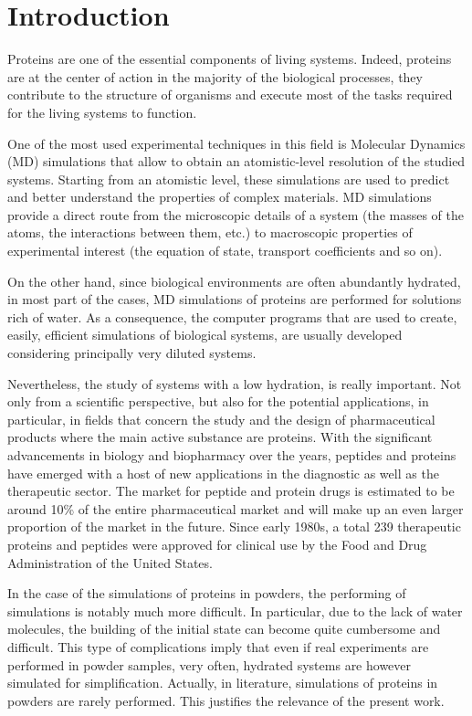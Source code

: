 \chapter*{Introduction} 

Proteins are one of the essential components of living systems. Indeed, proteins are at the center of action in the majority of the biological processes, they contribute to the structure of organisms and execute most of the tasks required for the living systems to function.

One of the most used experimental techniques in this field is Molecular Dynamics (MD) simulations that allow to obtain an atomistic-level resolution of the studied systems.
Starting from an atomistic level, these simulations are used to predict and better understand the properties of complex materials. MD simulations provide a direct route from the microscopic details of a system (the masses of the atoms, the interactions between them, etc.) to macroscopic properties of experimental interest (the equation of state, transport coefficients and so on).

On the other hand, since biological environments are often abundantly hydrated, in most part of the cases, MD simulations of proteins are performed for solutions rich of water. As a consequence, the computer programs that are used to create, easily, efficient simulations of biological systems, are usually developed considering principally very diluted systems. 

Nevertheless, the study of systems with a low hydration, is really important. Not only from a scientific perspective, but also for the potential applications, in particular, in fields that concern the study and the design of pharmaceutical products where the main active substance are proteins.
With the significant advancements in biology and biopharmacy over the years, peptides and proteins have emerged with a host of new applications in the diagnostic as well as the therapeutic sector. The market for peptide and protein drugs is estimated to be around 10\% of the entire pharmaceutical market and will make up an even larger proportion of the market in the future. Since early 1980s, a total 239 therapeutic proteins and peptides were approved for clinical use by the Food and Drug Administration of the United States.

In the case of the simulations of proteins in powders, the performing of simulations is notably much more difficult. In particular, due to the lack of water molecules, the building of the initial state can become quite cumbersome and difficult. This type of complications imply that even if real experiments are performed in powder samples, very often, hydrated systems are however simulated for simplification. Actually, in literature, simulations of proteins in powders are rarely performed. This justifies the relevance of the present work. 


